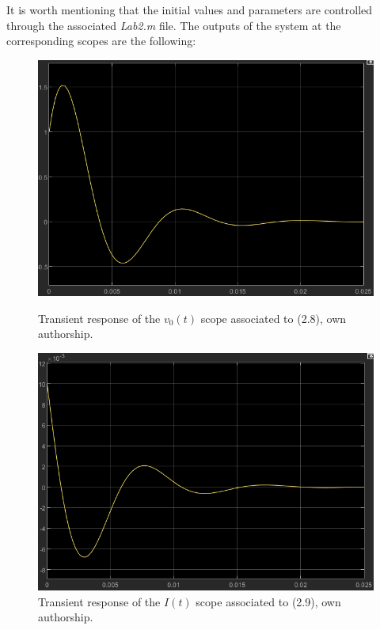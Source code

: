 \documentclass[a4paper,12pt]{article}
\begin{document}
It is worth mentioning that the initial values and parameters are controlled through the associated \textit{Lab2.m} file. The outputs of the system at the corresponding scopes are the following:

\vspace{0.5cm}

\begin{figure}[H]
    \centering
    \begin{minipage}[b]{0.4\linewidth}
        \centering
        \includegraphics[width=\linewidth]{fonts_lab_2/scope_v.png}
        \caption{Transient response of the $v_0(t)$ scope associated to (2.8), own authorship.}
        \label{fig:scopev}
    \end{minipage}
    \hspace{0.05\linewidth} %
    \begin{minipage}[b]{0.4\linewidth}
        \centering
        \includegraphics[width=\linewidth]{fonts_lab_2/scope_i.png}
        \caption{Transient response of the $I(t)$ scope associated to (2.9), own authorship.}
        \label{fig:scopei}
    \end{minipage}
\end{figure}
\end{document}

